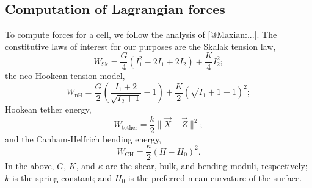 \subsection{Computation of Lagrangian forces}

To compute forces for a cell, we follow the analysis of [@Maxian:...]. The
constitutive laws of interest for our purposes are the Skalak tension law,
\begin{equation}
    W_\text{Sk} = \frac{G}{4}(I_1^2-2I_1+2I_2) + \frac{K}{4}I_2^2;
\end{equation}
the neo-Hookean tension model,
\begin{equation}
    W_\text{nH} = \frac{G}{2}\left(\frac{I_1+2}{\sqrt{I_2+1}}-1\right) + \frac{K}{2}\left(\sqrt{I_1+1}-1\right)^2;
\end{equation}
Hookean tether energy,
\begin{equation}
    W_\text{tether} = \frac{k}{2}\|\vec{X}-\vec{Z}\|^2;
\end{equation}
and the Canham-Helfrich bending energy,
\begin{equation}
    W_\text{CH} = \frac{\kappa}{2}(H-H_0)^2.
\end{equation}
In the above, $G$, $K$, and $\kappa$ are the shear, bulk, and bending moduli,
respectively; $k$ is the spring constant; and $H_0$ is the preferred mean
curvature of the surface.

